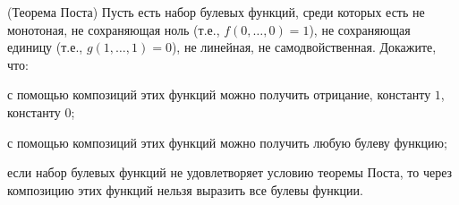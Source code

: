 (Теорема Поста) Пусть есть набор булевых функций, среди которых есть не монотоная, не сохраняющая ноль (т.е.,
$f(0, \dots, 0) = 1$), не сохраняющая единицу (т.е., $g(1, \dots, 1) = 0$), не линейная, не самодвойственная. Докажите, что:
\begin{enumcyr}
    \item с помощью композиций этих функций можно получить отрицание, константу $1$, константу $0$;
    \item с помощью композиций этих функций можно получить любую булеву функцию;
    \item если набор булевых функций не удовлетворяет условию теоремы Поста, то через композицию этих функций нельзя выразить
	    все булевы функции.
\end{enumcyr}